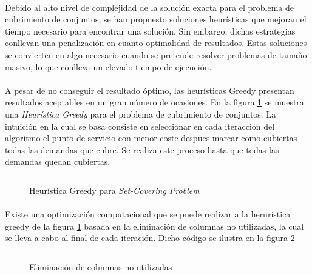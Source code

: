 \documentclass[spanish]{article}
\begin{document}
		\paragraph{}
		Debido al alto nivel de complejidad de la solución exacta para el problema de cubrimiento de conjuntos, se han propuesto soluciones heurísticas que mejoran el tiempo necesario para encontrar una solución. Sin embargo, dichas estrategias conllevan una penalización en cuanto optimalidad de resultados. Estas soluciones se convierten en algo necesario cuando se pretende resolver problemas de tamaño masivo, lo que conlleva un elevado tiempo de ejecución.

		\paragraph{}
		A pesar de no conseguir el resultado óptimo, las heurísticas Greedy presentan resultados aceptables en un gran número de ocasiones. En la figura \ref{code:greedy-set-covering} se muestra una \emph{Heurística Greedy} para el problema de cubrimiento de conjuntos. La intuición en la cual se basa consiste en seleccionar en cada iteracción del algoritmo el punto de servicio con menor coste despues marcar como cubiertas todas las demandas que cubre. Se realiza este proceso hasta que todas las demandas quedan cubiertas.

		\begin{figure}[h]
			\centering
			\inputminted{basic}{./code/set-covering-greedy.mos}
			\caption{Heurística Greedy para \emph{Set-Covering Problem}}
			\label{code:greedy-set-covering}
		\end{figure}

		\paragraph{}
		Existe una optimización computacional que se puede realizar a la herurística greedy de la figura \ref{code:greedy-set-covering} basada en la eliminación de columnas no utilizadas, la cual se lleva a cabo al final de cada iteración. Dicho código se ilustra en la figura \ref{code:column-deletion}

		\begin{figure}[h]
			\centering
			\inputminted{basic}{./code/column-deletion.mos}
			\caption{Eliminación de columnas no utilizadas}
			\label{code:column-deletion}
		\end{figure}
\end{document}
